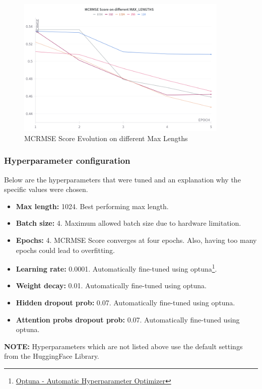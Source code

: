 \begin{figure}[H]
\begin{center}
\includegraphics[keepaspectratio, width=0.9\textwidth]{img/max_length.png}
\caption{MCRMSE Score Evolution on different Max Lengths}
\label{fig:max_length}
\end{center}
\end{figure}

\subsubsection*{Hyperparameter configuration}
Below are the hyperparameters that were tuned and an explanation why the specific values were chosen.

\begin{itemize}
	\item \textbf{Max length:} 1024. Best performing max length.
	\item \textbf{Batch size:} 4. Maximum allowed batch size due to hardware limitation.
    \item \textbf{Epochs:} 4. MCRMSE Score converges at four epochs. Also, having too many epochs could lead to overfitting.
    \item \textbf{Learning rate:} 0.0001. Automatically fine-tuned using optuna\footnote{\href{https://optuna.org/}{Optuna - Automatic Hyperparameter Optimizer}}.
    \item \textbf{Weight decay:} 0.01. Automatically fine-tuned using optuna.
    \item \textbf{Hidden dropout prob:} 0.07. Automatically fine-tuned using optuna.
    \item \textbf{Attention probs dropout prob:} 0.07. Automatically fine-tuned using optuna.
\end{itemize}
\textbf{NOTE:} Hyperparameters which are not listed above use the default settings from the HuggingFace Library.


